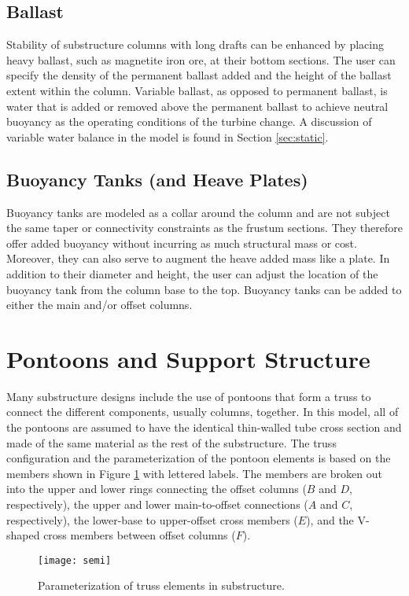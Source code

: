 \subsection{Ballast}
Stability of substructure columns with long drafts can be enhanced by
placing heavy ballast, such as magnetite iron ore, at their bottom
sections.  The user can specify the density of the permanent ballast
added and the height of the ballast extent within the column.  Variable
ballast, as opposed to permanent ballast, is water that is added or
removed above the permanent ballast to achieve neutral buoyancy as the
operating conditions of the turbine change.  A discussion of variable
water balance in the model is found in Section \ref{sec:static}.

\subsection{Buoyancy Tanks (and Heave Plates)}
Buoyancy tanks are modeled as a collar around the column and are not
subject the same taper or connectivity constraints as the frustum
sections.  They therefore offer added buoyancy without incurring as much
structural mass or cost.  Moreover, they can also serve to augment the
heave added mass like a plate.  In addition to their diameter and
height, the user can adjust the location of the buoyancy tank from the
column base to the top. Buoyancy tanks can be added to either the main
and/or offset columns.

\section{Pontoons and Support Structure}
Many substructure designs include the use of pontoons that form a truss
to connect the different components, usually columns, together.  In this
model, all of the pontoons are assumed to have the identical thin-walled
tube cross section and made of the same material as the rest of the
substructure.  The truss configuration and the parameterization of the
pontoon elements is based on the members shown in Figure
\ref{fig:pontoon} with lettered labels.  The members are broken out into
the upper and lower rings connecting the offset columns ($B$ and $D$,
respectively), the upper and lower main-to-offset connections ($A$ and
$C$, respectively), the lower-base to upper-offset cross members ($E$),
and the V-shaped cross members between offset columns ($F$).

\begin{figure}[htb]
  \begin{center}
    \texttt{[image: semi]}
    \caption{Parameterization of truss elements in substructure.}
    \label{fig:pontoon}
  \end{center}
\end{figure}


